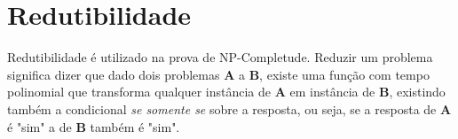 \section{Redutibilidade}
Redutibilidade é utilizado na prova de NP-Completude. Reduzir um problema significa dizer que dado dois problemas \textbf{A} a \textbf{B}, existe uma função com tempo polinomial que transforma qualquer instância de \textbf{A} em instância de \textbf{B}, existindo também a condicional \textit{se somente se} sobre a resposta, ou seja, se a resposta de \textbf{A} é "sim" a de \textbf{B} também é "sim".

